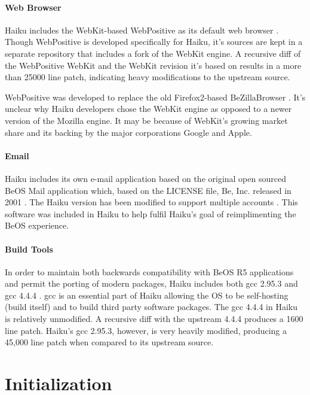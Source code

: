 \documentclass{article}
\begin{document}
\paragraph{Web Browser}
Haiku includes the WebKit-based WebPositive as its default web
browser \cite{WebPositiveWiki}.  Though WebPositive is developed
specifically for Haiku, it's sources are kept in a separate
repository \cite{WebPositiveTrac} that includes a fork of the WebKit
engine.  A recursive diff of the WebPositive WebKit and the WebKit
revision it's based on results in a more than 25000 line patch,
indicating heavy modifications to the upstream source.

WebPositive was developed to replace the old Firefox2-based
BeZillaBrowser \cite{WebPositiveWiki}.  It's unclear why Haiku
developers chose the WebKit engine as opposed to a newer version of
the Mozilla engine.  It may be because of WebKit's growing market
share and its backing by the major corporations Google and Apple.

\paragraph{Email}
Haiku includes its own e-mail application based on the original open
sourced BeOS Mail application \cite{BeMailOpenSourced} which, based on
the LICENSE file, Be, Inc. released in 2001 \cite{BeMailLICENSE}.  The
Haiku version has been modified to support multiple
accounts \cite{BeMailOpenSourced}.  This software was included in
Haiku to help fulfil Haiku's goal of reimplimenting the BeOS
experience.

\paragraph{Build Tools}
In order to maintain both backwards compatibility with BeOS R5
applications and permit the porting of modern packages, Haiku includes
both gcc 2.95.3 and gcc 4.4.4 \cite{GCCHybrids}.  gcc is an essential
part of Haiku allowing the OS to be self-hosting (build itself) and to
build third party software packages.  The gcc 4.4.4 in Haiku is
relatively unmodified.  A recursive diff with the upstream 4.4.4
produces a 1600 line patch.  Haiku's gcc 2.95.3, however, is very
heavily modified, producing a 45,000 line patch when compared to its
upstream source.

\section{Initialization}
\end{document}
